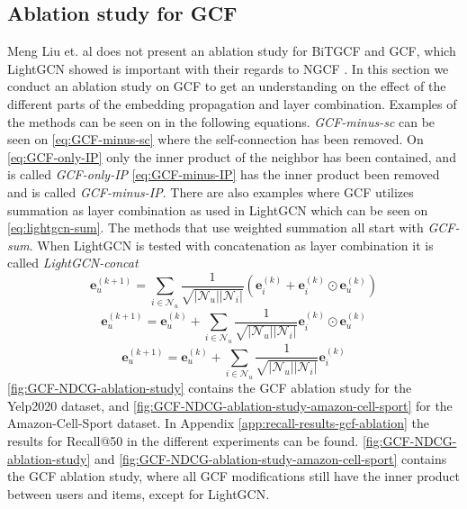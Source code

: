 \subsection{Ablation study for GCF}\label{subsec:gcf-ablation-study}
Meng Liu et. al does not present an ablation study for BiTGCF and GCF, which LightGCN showed is important with their regards to NGCF \cite{lightgcn,BiTGCF}.
In this section we conduct an ablation study on GCF to get an understanding on the effect of the different parts of the embedding propagation and layer combination.
Examples of the methods can be seen on in the following equations.
\textit{GCF-minus-sc} can be seen on \autoref{eq:GCF-minus-sc} where the self-connection has been removed.
On \autoref{eq:GCF-only-IP} only the inner product of the neighbor has been contained, and is called \textit{GCF-only-IP}
\autoref{eq:GCF-minus-IP} has the inner product been removed and is called \textit{GCF-minus-IP}.
There are also examples where GCF utilizes summation as layer combination as used in LightGCN which can be seen on \autoref{eq:lightgcn-sum}.
The methods that use weighted summation all start with \textit{GCF-sum}.
When LightGCN is tested with concatenation as layer combination it is called \textit{LightGCN-concat}
\begin{equation}
    \mathbf{e}_{u}^{(k+1)} = \sum^{}_{i \in \mathcal{N}_u}  \frac{1}{\sqrt{|\mathcal{N}_u||\mathcal{N}_i|}}\left( \mathbf{e}_i^{(k)} + \mathbf{e}_i^{(k)} \odot \mathbf{e}_u^{(k)} \right)
    \label{eq:GCF-minus-sc}
\end{equation}
\begin{equation}
    \mathbf{e}_{u}^{(k+1)} = \mathbf{e}_{u}^{(k)} + \sum^{}_{i \in \mathcal{N}_u}  \frac{1}{\sqrt{|\mathcal{N}_u||\mathcal{N}_i|}} \mathbf{e}_i^{(k)} \odot \mathbf{e}_u^{(k)}
    \label{eq:GCF-only-IP}
\end{equation}
\begin{equation}
    \mathbf{e}_{u}^{(k+1)} = \mathbf{e}_{u}^{(k)} + \sum^{}_{i \in \mathcal{N}_u}  \frac{1}{\sqrt{|\mathcal{N}_u||\mathcal{N}_i|}} \mathbf{e}_i^{(k)}
    \label{eq:GCF-minus-IP}
\end{equation}
\autoref{fig:GCF-NDCG-ablation-study} contains the GCF ablation study for the Yelp2020 dataset, and \autoref{fig:GCF-NDCG-ablation-study-amazon-cell-sport} for the Amazon-Cell-Sport dataset.
In Appendix \ref{app:recall-results-gcf-ablation} the results for Recall@50 in the different experiments can be found.
\autoref{fig:GCF-NDCG-ablation-study} and \autoref{fig:GCF-NDCG-ablation-study-amazon-cell-sport} contains the GCF ablation study, where all GCF modifications still have the inner product between users and items, except for LightGCN.
